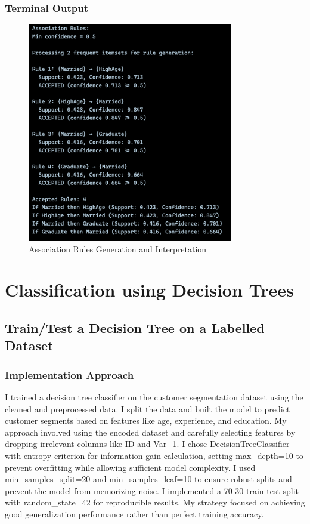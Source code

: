 \documentclass[12pt,a4paper]{article}
\begin{document}
\subsubsection{Terminal Output}

\begin{figure}[h!]
    \centering
    \includegraphics[width=0.8\textwidth]{Figures/rule_generation_process.png}
    \caption{Association Rules Generation and Interpretation}
\end{figure}

\newpage
\section{Classification using Decision Trees}

\subsection{Train/Test a Decision Tree on a Labelled Dataset}

\subsubsection{Implementation Approach}
I trained a decision tree classifier on the customer segmentation dataset using the cleaned and preprocessed data. I split the data and built the model to predict customer segments based on features like age, experience, and education. My approach involved using the encoded dataset and carefully selecting features by dropping irrelevant columns like ID and Var\_1. I chose DecisionTreeClassifier with entropy criterion for information gain calculation, setting max\_depth=10 to prevent overfitting while allowing sufficient model complexity. I used min\_samples\_split=20 and min\_samples\_leaf=10 to ensure robust splits and prevent the model from memorizing noise. I implemented a 70-30 train-test split with random\_state=42 for reproducible results. My strategy focused on achieving good generalization performance rather than perfect training accuracy.
\end{document}
